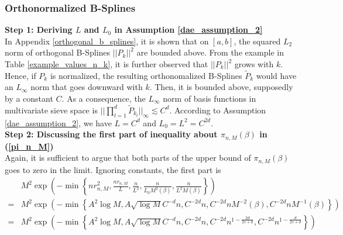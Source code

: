         \subsubsection{Orthonormalized B-Splines}\label{orthonormalized_b-splines}

        \textbf{Step 1: Deriving $L$ and $L_0$ in Assumption \ref{dae_assumption_2}}\\
        In Appendix \ref{orthogonal_b_splines}, it is shown that on $[a,b]$, the squared $L_2$ norm of orthogonal B-Splines $||P_k||^2$ are bounded above. From the example in Table \ref{example_values_n_k}, it is further observed that $||P_k||^2$ grows with $k$. Hence, if $P_k$ is normalized, the resulting orthonomalized B-Splines $\tilde{P}_k$ would have an $L_{\infty}$ norm that goes downward with $k$. Then, it is bounded above, supposedly by a constant $C$. As a consequence, the $L_{\infty}$ norm of basis functions in multivariate sieve space is $||\prod_{l=1}^d \tilde{P}_{k_l}||_{\infty} \lesssim C^d$. According to Assumption \ref{dae_assumption_2}, we have $L=C^d$ and $L_0=L^2=C^{2d}$. \\
    
        \textbf{Step 2: Discussing the first part of inequality about $\pi_{n,M}(\beta)$ in (\ref{pi_n_M})}\\
        Again, it is sufficient to argue that both parts of the upper bound of $\pi_{n,M}(\beta)$ goes to zero in the limit. Ignoring constants, the first part is
        \begin{align*}
            &M^2\exp\left( -\min\left\{ nr_{n,M}^2, \frac{nr_{n,M}}{L}, \frac{n}{L^2}, \frac{n}{L_0M^2(\beta)},\frac{n}{L^2M(\beta)} \right\} \right)\\
            =& M^2\exp\left( -\min\left\{ A^2 \log M, A\sqrt{\log M}C^{-d}n, C^{-2d}n, C^{-2d}nM^{-2}(\beta), C^{-2d}nM^{-1}(\beta) \right\} \right)\\
            =& M^2\exp\left( -\min\left\{ A^2 \log M, A\sqrt{\log M}C^{-d}n, C^{-2d}n, C^{-2d}n^{1-\frac{2d}{2s+d}}, C^{-2d}n^{1-\frac{d}{2s+d}} \right\} \right)
        \end{align*}

